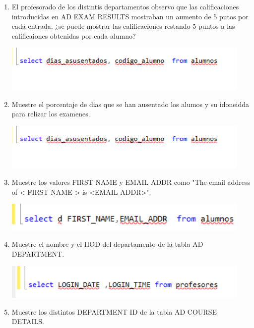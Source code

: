 \documentclass[12pt,letterpaper]{article}
\begin{document}
\begin{enumerate}[1.]
     \item El profesorado de los distintis departamentos observo que las calificaciones introducidas en AD EXAM RESULTS mostraban un aumento de 5 putos por cada entrada. ¿se puede mostrar las calificaciones restando 5 puntos a las calificaiones obtenidas por cada alumno?
     

\begin{center}
\includegraphics[width=12cm]{./IMAGENES/imagen6_2_2}
\end{center}

     
     
       
    \item Muestre el porcentaje de dias que se han ausentado los alumos y su idoneidda para relizar los examenes.
    
   
\begin{center}
\includegraphics[width=12cm]{./IMAGENES/imagen6_2_2}
\end{center}

    
    \item Muestre los valores FIRST NAME y EMAIL ADDR como "The email address of < FIRST NAME > is <EMAIL ADDR>".
    
   
\begin{center}
\includegraphics[width=12cm]{./IMAGENES/imagen6_2_3}
\end{center}

  
    \item Muestre el nombre y el HOD del departamento de la tabla AD DEPARTMENT.
    
   
\begin{center}
\includegraphics[width=12cm]{./IMAGENES/imagen6_4}
\end{center}

     
      
    \item Muestre los distintos DEPARTMENT ID de la tabla AD COURSE DETAILS.   
\end{enumerate}
\end{document}
